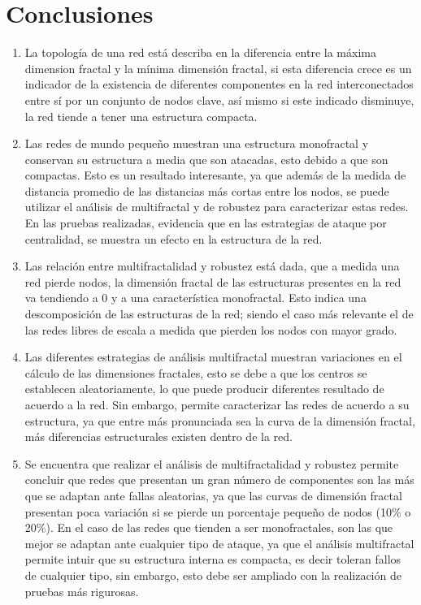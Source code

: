 \section{Conclusiones}

\begin{enumerate}
    \item La topología de una red está describa en la diferencia entre la máxima dimension fractal y la mínima dimensión fractal, si esta diferencia crece es un indicador de la existencia de diferentes componentes en la red interconectados entre sí por un conjunto de nodos clave, así mismo si este indicado disminuye, la red tiende a tener una estructura compacta.
    \item Las redes de mundo pequeño muestran una estructura monofractal y conservan su estructura a media que son atacadas, esto debido a que son compactas. Esto es un resultado interesante, ya que además de la medida de distancia promedio de las distancias más cortas entre los nodos, se puede utilizar el análisis de multifractal y de robustez para caracterizar estas redes. En las pruebas realizadas, evidencia que en las estrategias de ataque por centralidad, se muestra un efecto en la estructura de la red.
    \item Las relación entre multifractalidad y robustez está dada, que a medida una red pierde nodos, la dimensión fractal de las estructuras presentes en la red va tendiendo a 0 y a una característica monofractal. Esto indica una descomposición de las estructuras de la red; siendo el caso más relevante el de las redes libres de escala a medida que pierden los nodos con mayor grado.
    \item Las diferentes estrategias de análisis multifractal muestran variaciones en el cálculo de las dimensiones fractales, esto se debe a que los centros se establecen aleatoriamente, lo que puede producir diferentes resultado de acuerdo a la red. Sin embargo, permite caracterizar las redes de acuerdo a su estructura, ya que entre más pronunciada sea la curva de la dimensión fractal, más diferencias estructurales existen dentro de la red.
    \item Se encuentra que realizar el análisis de multifractalidad y robustez permite concluir que redes que presentan un gran número de componentes son las más que se adaptan ante fallas aleatorias, ya que las curvas de dimensión fractal presentan poca variación si se pierde un porcentaje pequeño de nodos (10\% o 20\%). En el caso de las redes que tienden a ser monofractales, son las que mejor se adaptan ante cualquier tipo de ataque, ya que el análisis multifractal permite intuir que su estructura interna es compacta, es decir toleran fallos de cualquier tipo, sin embargo, esto debe ser ampliado con la realización de pruebas más rigurosas.

\end{enumerate}
